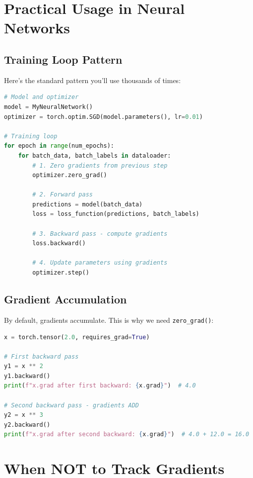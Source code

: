 \documentclass{article}
\begin{document}
\section{Practical Usage in Neural Networks}

\subsection{Training Loop Pattern}

Here's the standard pattern you'll use thousands of times:

\begin{lstlisting}[language=Python]
# Model and optimizer
model = MyNeuralNetwork()
optimizer = torch.optim.SGD(model.parameters(), lr=0.01)

# Training loop
for epoch in range(num_epochs):
    for batch_data, batch_labels in dataloader:
        # 1. Zero gradients from previous step
        optimizer.zero_grad()
        
        # 2. Forward pass
        predictions = model(batch_data)
        loss = loss_function(predictions, batch_labels)
        
        # 3. Backward pass - compute gradients
        loss.backward()
        
        # 4. Update parameters using gradients
        optimizer.step()
\end{lstlisting}

\subsection{Gradient Accumulation}

By default, gradients accumulate. This is why we need \texttt{zero\_grad()}:

\begin{lstlisting}[language=Python]
x = torch.tensor(2.0, requires_grad=True)

# First backward pass
y1 = x ** 2
y1.backward()
print(f"x.grad after first backward: {x.grad}")  # 4.0

# Second backward pass - gradients ADD
y2 = x ** 3
y2.backward()
print(f"x.grad after second backward: {x.grad}")  # 4.0 + 12.0 = 16.0
\end{lstlisting}

\section{When NOT to Track Gradients}
\end{document}
